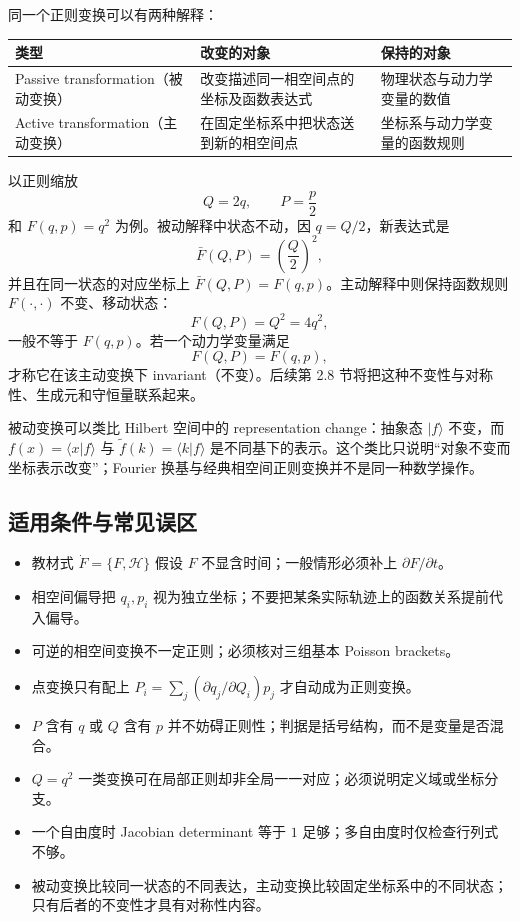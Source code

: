 
同一个正则变换可以有两种解释：
\begin{center}
\begin{tabularx}{0.92\textwidth}{@{}lXX@{}}
  \toprule
  类型 & 改变的对象 & 保持的对象 \\
  \midrule
  Passive transformation（被动变换）
    & 改变描述同一相空间点的坐标及函数表达式
    & 物理状态与动力学变量的数值 \\
  Active transformation（主动变换）
    & 在固定坐标系中把状态送到新的相空间点
    & 坐标系与动力学变量的函数规则 \\
  \bottomrule
\end{tabularx}
\end{center}

以正则缩放
\[
  Q=2q,
  \qquad
  P=\frac p2
\]
和 $F(q,p)=q^2$ 为例。被动解释中状态不动，因 $q=Q/2$，新表达式是
\[
  \bar F(Q,P)=\left(\frac Q2\right)^2,
\]
并且在同一状态的对应坐标上 $\bar F(Q,P)=F(q,p)$。主动解释中则保持函数规则 $F(\cdot,\cdot)$ 不变、移动状态：
\[
  F(Q,P)=Q^2=4q^2,
\]
一般不等于 $F(q,p)$。若一个动力学变量满足
\begin{equation}
  F(Q,P)=F(q,p),
  \label{eq:QM-C02-S07-active-invariance}
\end{equation}
才称它在该主动变换下 invariant（不变）。后续第 2.8 节将把这种不变性与对称性、生成元和守恒量联系起来。

被动变换可以类比 Hilbert 空间中的 representation change：抽象态 $|f\rangle$ 不变，而 $f(x)=\langle x|f\rangle$ 与 $\widetilde f(k)=\langle k|f\rangle$ 是不同基下的表示。这个类比只说明“对象不变而坐标表示改变”；Fourier 换基与经典相空间正则变换并不是同一种数学操作。

\subsection{适用条件与常见误区}

\begin{itemize}[leftmargin=*]
  \item 教材式 $\dot F=\{F,\mathcal H\}$ 假设 $F$ 不显含时间；一般情形必须补上 $\partial F/\partial t$。
  \item 相空间偏导把 $q_i,p_i$ 视为独立坐标；不要把某条实际轨迹上的函数关系提前代入偏导。
  \item 可逆的相空间变换不一定正则；必须核对三组基本 Poisson brackets。
  \item 点变换只有配上 $P_i=\sum_j(\partial q_j/\partial Q_i)p_j$ 才自动成为正则变换。
  \item $P$ 含有 $q$ 或 $Q$ 含有 $p$ 并不妨碍正则性；判据是括号结构，而不是变量是否混合。
  \item $Q=q^2$ 一类变换可在局部正则却非全局一一对应；必须说明定义域或坐标分支。
  \item 一个自由度时 Jacobian determinant 等于 $1$ 足够；多自由度时仅检查行列式不够。
  \item 被动变换比较同一状态的不同表达，主动变换比较固定坐标系中的不同状态；只有后者的不变性才具有对称性内容。
\end{itemize}

